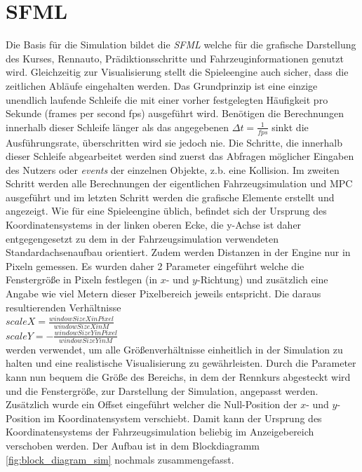 \documentclass{like}
\begin{document}
\section{\acl{SFML}}
Die Basis für die Simulation bildet die \emph{ \ac{SFML}} welche für die grafische Darstellung des Kurses, Rennauto, Prädiktionsschritte und Fahrzeuginformationen genutzt wird. Gleichzeitig zur Visualisierung stellt die Spieleengine auch sicher, dass die zeitlichen Abläufe eingehalten werden. Das Grundprinzip ist eine einzige unendlich laufende Schleife die mit einer vorher festgelegten Häufigkeit pro Sekunde (frames per second fps) ausgeführt wird. Benötigen die Berechnungen innerhalb dieser Schleife länger als das angegebenen $\Delta t = \frac{1}{fps}$ sinkt die Ausführungsrate, überschritten wird sie jedoch nie. Die Schritte, die innerhalb dieser Schleife abgearbeitet werden sind zuerst das Abfragen möglicher Eingaben des Nutzers oder \emph{events} der einzelnen Objekte, z.b. eine Kollision. Im zweiten Schritt werden alle Berechnungen der eigentlichen Fahrzeugsimulation und \ac{MPC} ausgeführt und im letzten Schritt werden die grafische Elemente erstellt und angezeigt. Wie für eine Spieleengine üblich, befindet sich der Ursprung des Koordinatensystems in der linken oberen Ecke, die y-Achse ist daher entgegengesetzt zu dem in der Fahrzeugsimulation verwendeten Standardachsenaufbau orientiert. Zudem werden Distanzen in der Engine nur in Pixeln gemessen. Es wurden daher 2 Parameter eingeführt welche die Fenstergröße in Pixeln festlegen (in \(x\)- und  \(y\)-Richtung)
und zusätzlich eine Angabe wie viel Metern dieser Pixelbereich jeweils entspricht. Die daraus resultierenden Verhältnisse \\
$scaleX = \frac{windowSizeXinPixel}{windowSizeXinM}$ \\
$scaleY = - \frac{windowSizeYinPixel}{windowSizeYinM}$ \\
werden verwendet, um alle Größenverhältnisse einheitlich in der Simulation zu halten und eine realistische Visualisierung zu gewährleisten. Durch die Parameter kann nun bequem die Größe des Bereichs, in dem der Rennkurs abgesteckt wird und die Fenstergröße, zur Darstellung der Simulation, angepasst werden. Zusätzlich wurde ein Offset eingeführt welcher die Null-Position der \(x\)- und \(y\)- Position im Koordinatensystem verschiebt. Damit kann der Ursprung des Koordinatensystems der Fahrzeugsimulation beliebig im Anzeigebereich verschoben werden. 
Der Aufbau ist in dem Blockdiagramm \ref{fig:block_diagram_sim} nochmals zusammengefasst. 
\end{document}
